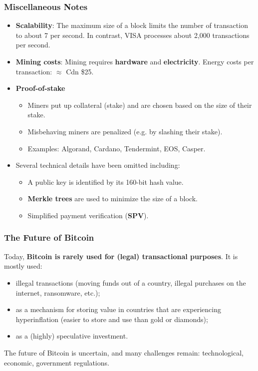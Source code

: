 \documentclass[12pt,titlepage]{article}
\begin{document}
\subsubsection{Miscellaneous Notes}
\begin{itemize}
	\item \textbf{Scalability}: The maximum size of a block limits the number of transaction to about 7 per second. In contrast, VISA processes about 2,000 transactions per second.
	\item \textbf{Mining costs}: Mining requires \textbf{hardware} and \textbf{electricity}. Energy costs per transaction: $\approx$ Cdn \$25.
	\item \textbf{Proof-of-stake}\begin{itemize}
		\item Miners put up collateral (stake) and are chosen based on the size of their stake.
		\item Misbehaving miners are penalized (e.g. by slashing their stake).
		\item Examples: Algorand, Cardano, Tendermint, EOS, Casper.
	\end{itemize}
	\item Several technical details have been omitted including:\begin{itemize}
		\item A public key is identified by its 160-bit hash value.
		\item \textbf{Merkle trees} are used to minimize the size of a block.
		\item Simplified payment verification (\textbf{SPV}).
	\end{itemize}
\end{itemize}

\subsubsection{The Future of Bitcoin}
Today, \textbf{Bitcoin is rarely used for (legal) transactional purposes}. It is mostly used:\begin{itemize}
	\item illegal transactions (moving funds out of a country, illegal purchases on the internet, ransomware, etc.);
	\item as a mechanism for storing value in countries that are experiencing hyperinﬂation (easier to store and use than gold or diamonds);
	\item as a (highly) speculative investment.
\end{itemize}
The future of Bitcoin is uncertain, and many challenges remain: technological, economic, government regulations.
\end{document}
